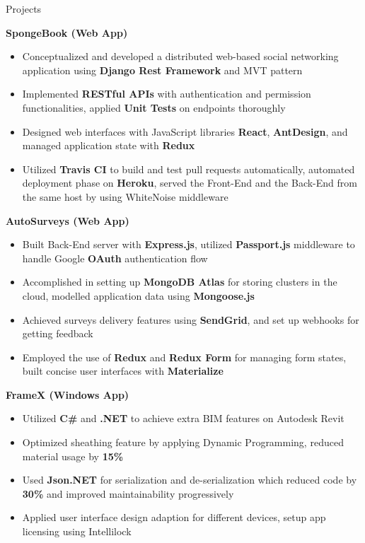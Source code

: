 \documentclass{resume} %
\begin{document}
\begin{rSection}{Projects}

{\bf SpongeBook (Web App)}
\begin{itemize}
\item Conceptualized and developed a distributed web-based social networking application using \textbf{Django Rest Framework} and MVT pattern
\item Implemented \textbf{RESTful APIs} with authentication and permission functionalities, applied \textbf{Unit Tests} on endpoints thoroughly
\item Designed web interfaces with JavaScript libraries \textbf{React}, \textbf{AntDesign}, and managed application state with \textbf{Redux}
\item Utilized \textbf{Travis CI} to build and test pull requests automatically, automated deployment phase on \textbf{Heroku}, served the Front-End and the Back-End from the same host by using WhiteNoise middleware
\end{itemize}

{\bf AutoSurveys (Web App)}
\begin{itemize}
\item Built Back-End server with \textbf{Express.js}, utilized \textbf{Passport.js} middleware to handle Google \textbf{OAuth} authentication flow
\item Accomplished in setting up \textbf{MongoDB Atlas} for storing clusters in the cloud, modelled application data using \textbf{Mongoose.js} 
\item Achieved surveys delivery features using \textbf{SendGrid}, and set up webhooks for getting feedback
\item Employed the use of \textbf{Redux} and \textbf{Redux Form} for managing form states, built concise user interfaces with \textbf{Materialize}
\end{itemize}

{\bf FrameX  (Windows App)}
\begin{itemize}
\item Utilized \textbf{C\#} and \textbf{.NET} to achieve extra BIM features on Autodesk Revit
\item Optimized sheathing feature by applying Dynamic Programming, reduced material usage by \textbf{15\%}
\item  Used \textbf{Json.NET} for serialization and de-serialization which reduced code by \textbf{30\%}  and improved maintainability progressively
\item Applied user interface design adaption for different devices, setup app licensing using Intellilock
\end{itemize}


\end{rSection}
\end{document}
